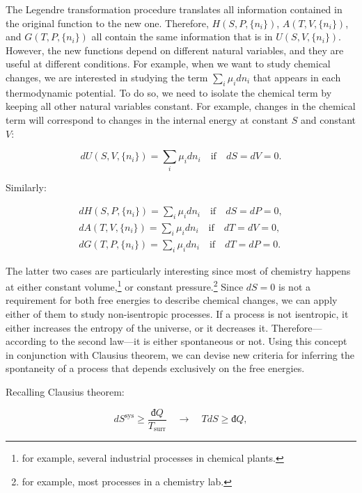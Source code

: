 \documentclass[
  9pt,
]{extbook}
\theoremstyle{definition}
\theoremstyle{definition}
\theoremstyle{definition}
\theoremstyle{remark}
\begin{document}
The Legendre transformation procedure translates all information contained in the original function to the new one. Therefore, \(H(S,P,\{n_i\})\), \(A(T,V,\{n_i\})\), and \(G(T,P,\{n_i\})\) all contain the same information that is in \(U(S,V,\{n_i\})\). However, the new functions depend on different natural variables, and they are useful at different conditions. For example, when we want to study chemical changes, we are interested in studying the term \(\sum_i\mu_i dn_i\) that appears in each thermodynamic potential. To do so, we need to isolate the chemical term by keeping all other natural variables constant. For example, changes in the chemical term will correspond to changes in the internal energy at constant \(S\) and constant \(V\):

\begin{equation}
dU(S,V,\{n_i\}) = \sum_i\mu_i dn_i \quad \text{if} \quad dS=dV=0.
\label{eq:duchem}
\end{equation}

Similarly:

\begin{equation}
\begin{aligned}
dH(S,P,\{n_i\}) = \sum_i\mu_i dn_i \quad \text{if} \quad dS=dP=0, \\
dA(T,V,\{n_i\}) = \sum_i\mu_i dn_i \quad \text{if} \quad dT=dV=0, \\
dG(T,P,\{n_i\}) = \sum_i\mu_i dn_i \quad \text{if} \quad dT=dP=0.
\end{aligned}
\label{eq:dhagchem}
\end{equation}

The latter two cases are particularly interesting since most of chemistry happens at either constant volume,\footnote{for example, several industrial processes in chemical plants.} or constant pressure.\footnote{for example, most processes in a chemistry lab.} Since \(dS=0\) is not a requirement for both free energies to describe chemical changes, we can apply either of them to study non-isentropic processes. If a process is not isentropic, it either increases the entropy of the universe, or it decreases it. Therefore---according to the second law---it is either spontaneous or not. Using this concept in conjunction with Clausius theorem, we can devise new criteria for inferring the spontaneity of a process that depends exclusively on the free energies.

Recalling Clausius theorem:

\begin{equation}
d S^{\mathrm{sys}} \geq \frac{đQ}{T_{\text{surr}}} \quad \longrightarrow \quad TdS \geq đQ,
\label{eq:dssyscrit}
\end{equation}
\end{document}
